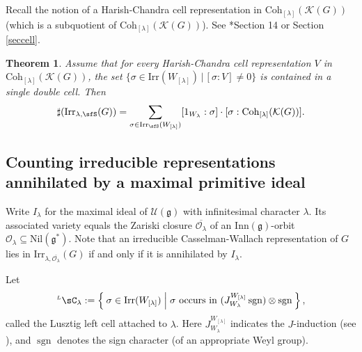 \documentclass[12pt,a4paper]{amsart}
\def\subset{\subseteq}
\newcommand{\CK}{{\mathcal {K}}}
\newcommand{\CO}{{\mathcal {O}}}
\newcommand{\CV}{{\mathcal {V}}}
\newcommand{\sgn}{\operatorname{sgn}}
\newcommand{\g}{\mathfrak g}
\numberwithin{equation}{section}
\newtheorem{thm}{Theorem}[section]
\theoremstyle{remark}
\def\Irr{\mathrm{Irr}}
\def\LC{{}^{\scriptscriptstyle L}\sC}
\def\Coh{\mathrm{Coh}}
\newcommand{\Lam}{{[\lambda]}}
\begin{document}
Recall the notion of a Harish-Chandra cell representation in $\Coh_{\Lam}(\CK(G))$ (which is a subquotient of $\Coh_{\Lam}(\CK(G))$). See \cite{V4}*{Section 14} or Section \ref{seccell}.


 \begin{thm}\label{counteq}
   Assume that for every Harish-Chandra cell representation $V$ in $\Coh_{\Lam}(\CK(G))$, the set $\{\sigma\in \Irr(W_{[\lambda]}) \,|\, [\sigma: V]\neq 0\}$ is contained in a single double cell. Then
  \begin{equation*}%
    \sharp(\Irr_{\lambda,\sfS}(G)) = \sum_{\sigma \in \Irr_\sfS(W_\Lam)} [1_{W_{\lambda}}: \sigma]\cdot [\sigma:\Coh_{\Lam}(\CK(G))].
  \end{equation*}
    \end{thm}






\subsection{Counting irreducible representations annihilated by a maximal primitive ideal}\label{sec13}
Write $I_\lambda$ for the maximal ideal of $\mathcal U(\g)$ with infinitesimal
character $\lambda$. Its associated variety equals the Zariski closure
$\overline{\CO_\lambda}$ of an $\mathrm{Inn}(\g)$-orbit
$\CO_\lambda\subset\mathrm{Nil}(\g^*) $. Note that an irreducible
Casselman-Wallach representation of $G$ lies in
$\Irr_{\lambda,\overline{\CO_\lambda}}(G)$ if and only if it is annihilated by
$I_\lambda$.


Let
\begin{equation}\label{eq:LC} \LC_{\lambda}:= \Set{\sigma\in \Irr(W_\Lam) | \sigma \text{ occurs in $(J_{W_{\lambda}}^{W_{\Lam}} \sgn )\otimes \sgn$}}, \end{equation}
called the Lusztig left cell attached to $\lambda$. Here $J_{W_{\lambda}}^{W_{\Lam}} $ indicates the $J$-induction (see \cite[Chapter 12]{Carter}), and $\sgn$
denotes the sign character (of an appropriate Weyl group).
\end{document}
